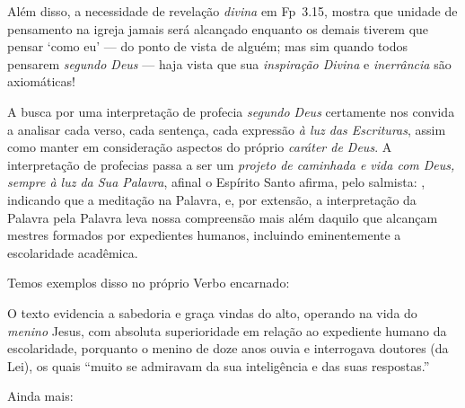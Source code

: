     Além disso, a necessidade de revelação \emph{divina} em Fp~3.15, mostra que unidade de  pensamento  na  igreja  jamais  será
    alcançado enquanto os demais tiverem que pensar `como eu' --- do ponto de vista de alguém; mas  sim  quando  todos  pensarem
    \emph{segundo Deus} --- haja vista que sua \emph{inspiração Divina} e \emph{inerrância} são axiomáticas!

    A busca por uma interpretação de profecia \emph{segundo Deus} certamente nos convida a analisar cada verso,  cada  sentença,
    cada expressão \emph{à luz das Escrituras}, assim como manter em consideração aspectos do próprio \emph{caráter de Deus}.  A
    interpretação de profecias passa a ser um \emph{projeto de caminhada e vida com Deus, sempre à luz da Sua Palavra}, afinal o
    Espírito Santo afirma, pelo salmista: , indicando que a meditação na Palavra, e,  por  extensão,  a  interpretação  da  Palavra  pela
    Palavra leva nossa compreensão  mais  além  daquilo  que  alcançam  mestres  formados  por  expedientes  humanos,  incluindo
    eminentemente a escolaridade acadêmica.

    Temos exemplos disso no próprio Verbo encarnado:


    O texto evidencia a sabedoria e graça vindas do alto, operando na vida do \emph{menino} Jesus, com absoluta superioridade em
    relação ao expediente humano da escolaridade, porquanto o menino de doze anos ouvia e  interrogava  doutores  (da  Lei),  os
    quais ``muito se admiravam da sua inteligência e das suas respostas.''

    Ainda mais:


